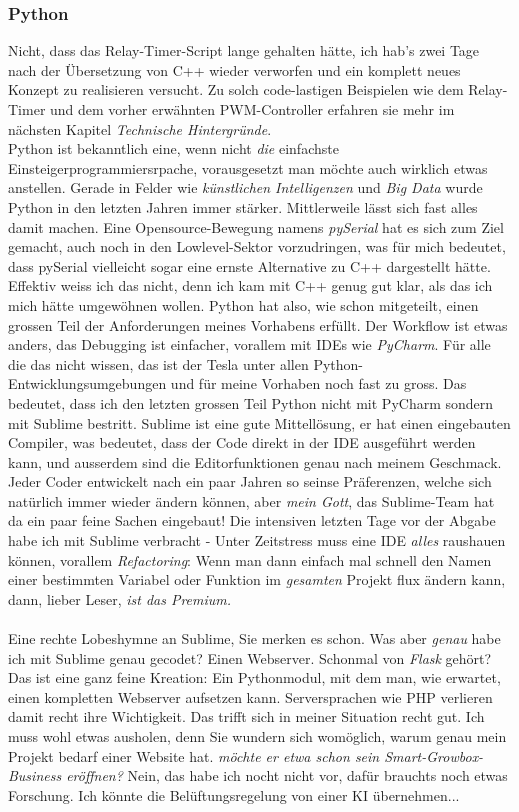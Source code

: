 \documentclass[12pt,titlepage,a4paper]{article}
\begin{document}
\subsubsection{Python}
Nicht, dass das Relay-Timer-Script lange gehalten hätte, ich hab's zwei Tage nach der Übersetzung von C++ wieder verworfen und ein komplett neues Konzept zu realisieren versucht. Zu solch code-lastigen Beispielen wie dem Relay-Timer und dem vorher erwähnten PWM-Controller erfahren sie mehr im nächsten Kapitel \textit{Technische Hintergründe}.\\Python ist bekanntlich eine, wenn nicht \textit{die} einfachste Einsteigerprogrammiersrpache, vorausgesetzt man möchte auch wirklich etwas anstellen. Gerade in Felder wie \textit{künstlichen Intelligenzen} und\textit{ Big Data} wurde Python in den letzten Jahren immer stärker. Mittlerweile lässt sich fast alles damit machen. Eine Opensource-Bewegung namens \textit{pySerial} hat es sich zum Ziel gemacht, auch noch in den Lowlevel-Sektor vorzudringen, was für mich bedeutet, dass pySerial vielleicht sogar eine ernste Alternative zu C++ dargestellt hätte. Effektiv weiss ich das nicht, denn ich kam mit C++ genug gut klar, als das ich mich hätte umgewöhnen wollen. Python hat also, wie schon mitgeteilt, einen grossen Teil der Anforderungen meines Vorhabens erfüllt. Der Workflow ist etwas anders, das Debugging ist einfacher, vorallem mit IDEs wie \textit{PyCharm}. Für alle die das nicht wissen, das ist der Tesla unter allen Python-Entwicklungsumgebungen und für meine Vorhaben noch fast zu gross. Das bedeutet, dass ich den letzten grossen Teil Python nicht mit PyCharm sondern mit Sublime bestritt. Sublime ist eine gute Mittellösung, er hat einen eingebauten Compiler, was bedeutet, dass der Code direkt in der IDE ausgeführt werden kann, und ausserdem sind die Editorfunktionen genau nach meinem Geschmack. Jeder Coder entwickelt nach ein paar Jahren so seinse Präferenzen, welche sich natürlich immer wieder ändern können, aber \textit{mein Gott}, das Sublime-Team hat da ein paar feine Sachen eingebaut! Die intensiven letzten Tage vor der Abgabe habe ich mit Sublime verbracht - Unter Zeitstress muss eine IDE \textit{alles} raushauen können, vorallem \textit{Refactoring}: Wenn man dann einfach mal schnell den Namen einer bestimmten Variabel oder Funktion im \textit{gesamten} Projekt flux ändern kann, dann, lieber Leser, \textit{ist das Premium.}
\\ \\ 
Eine rechte Lobeshymne an Sublime, Sie merken es schon. Was aber \textit{genau} habe ich mit Sublime genau gecodet? Einen Webserver. Schonmal von \textit{Flask} gehört? Das ist eine ganz feine Kreation: Ein Pythonmodul, mit dem man, wie erwartet, einen kompletten Webserver aufsetzen kann. Serversprachen wie PHP verlieren damit recht ihre Wichtigkeit. Das trifft sich in meiner Situation recht gut. Ich muss wohl etwas ausholen, denn Sie wundern sich womöglich, warum genau mein Projekt bedarf einer Website hat. \textit{möchte er etwa schon sein Smart-Growbox-Business eröffnen?} Nein, das habe ich nocht nicht vor, dafür brauchts noch etwas Forschung. Ich könnte die Belüftungsregelung von einer KI übernehmen... \\
\end{document}
